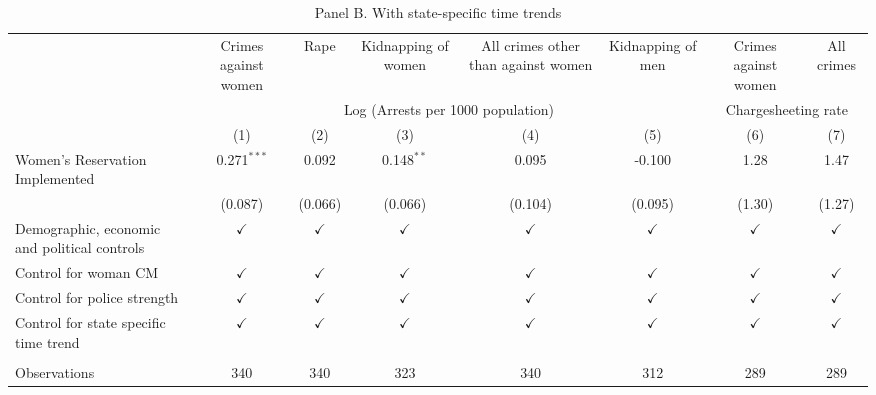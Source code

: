\begin{table}[htbp]
   \caption{Panel B. With state-specific time trends}
   \bigskip
   \centering
   \begin{tabular}{lccccccc}
      \toprule
                                                    & Crimes against women & Rape          & Kidnapping of women & All crimes other than against women & Kidnapping of men & Crimes against women & All crimes\\  
       & \multicolumn{5}{c}{Log (Arrests per 1000 population)} & \multicolumn{2}{c}{Chargesheeting rate} \\ 
                                                    & (1)                  & (2)           & (3)                 & (4)                                 & (5)               & (6)                  & (7)\\  
      \midrule 
      Women's Reservation Implemented               & 0.271$^{***}$        & 0.092         & 0.148$^{**}$        & 0.095                               & -0.100            & 1.28                 & 1.47\\   
                                                    & (0.087)              & (0.066)       & (0.066)             & (0.104)                             & (0.095)           & (1.30)               & (1.27)\\   
      Demographic, economic  and political controls & $\checkmark$         & $\checkmark$  & $\checkmark$        & $\checkmark$                        & $\checkmark$      & $\checkmark$         & $\checkmark$\\   
      Control for woman CM                          & $\checkmark$         & $\checkmark$  & $\checkmark$        & $\checkmark$                        & $\checkmark$      & $\checkmark$         & $\checkmark$\\   
      Control for police strength                   & $\checkmark$         & $\checkmark$  & $\checkmark$        & $\checkmark$                        & $\checkmark$      & $\checkmark$         & $\checkmark$\\   
      Control for state specific time trend         & $\checkmark$         & $\checkmark$  & $\checkmark$        & $\checkmark$                        & $\checkmark$      & $\checkmark$         & $\checkmark$\\   
       \\
      Observations                                  & 340                  & 340           & 323                 & 340                                 & 312               & 289                  & 289\\  

\end{tabular}
\end{table}
